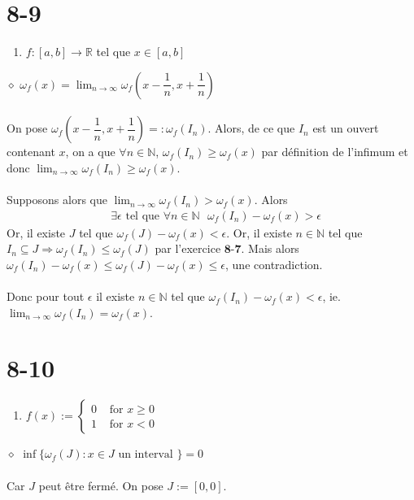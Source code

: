 \documentclass[a4paper,10pt]{article}
\begin{document}
\section*{8-9}
\begin{enumerate}
 \item $f : [a,b] \rightarrow \mathbb{R}$ tel que $x \in [a,b]$
\end{enumerate}
$\diamond$ $\omega_f (x) = \lim_{n \to \infty} \omega_f \left(x - \dfrac{1}{n}, x + \dfrac{1}{n} \right)$
\\
\\
On pose $\omega_f \left (x - \dfrac{1}{n}, x + \dfrac{1}{n} \right) =: \omega_f (I_n)$. 
Alors, de ce que $I_n$ est un ouvert contenant $x$, on a que $\forall n \in \mathbb{N}$, $\omega_f (I_n) \geq \omega_f (x)$ 
par définition de l'infimum et donc $\lim_{n \to \infty} \omega_f (I_n) \geq \omega_f (x)$. 
\\
\\
Supposons alors que $\lim_{n \to \infty} \omega_f (I_n) > \omega_f (x)$. Alors 
\begin{align*}
  & \exists \epsilon \text{ tel que } \forall n \in \mathbb{N} \text{    } \omega_f (I_n) - \omega_f (x) > \epsilon
\end{align*}
Or, il existe $J$ tel que $\omega_f (J) - \omega_f (x) < \epsilon$. Or, il existe $n \in \mathbb{N}$ tel que 
$I_n \subseteq J \Rightarrow \omega_f (I_n) \leq \omega_f (J)$ par l'exercice $\textbf{8-7}$. Mais alors 
$\omega_f (I_n) - \omega_f (x) \leq \omega_f (J) - \omega_f (x) \leq \epsilon$, une contradiction.
\\
\\
Donc pour tout $\epsilon$ il existe $n \in \mathbb{N}$ tel que $\omega_f (I_n) - \omega_f (x) < \epsilon$, ie. 
$\lim_{n \to \infty} \omega_f (I_n) = \omega_f (x)$.

\section*{8-10}
\begin{enumerate}
 \item $f(x) := \begin{cases}
 0 & \text{ for } x \geq 0 \\
 1 & \text{ for } x < 0
\end{cases}$
\end{enumerate}
$\diamond$ $\inf \{ \omega_f (J) : x \in J \text{ un interval }\} = 0$
\\
\\
Car $J$ peut être fermé. On pose $J := [0,0]$. 
\end{document}
